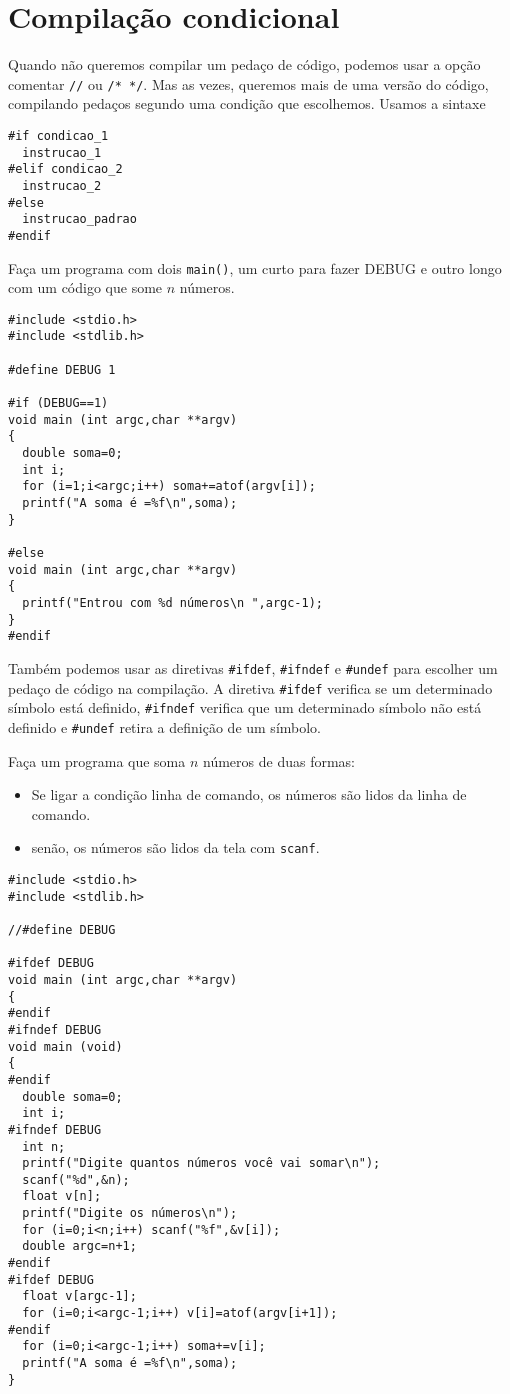 \section{Compilação condicional}
Quando não queremos compilar um pedaço de código, podemos usar a opção comentar \verb|//| ou \verb|/* */|. Mas as vezes, queremos mais de uma versão do código, compilando pedaços segundo uma condição que escolhemos. Usamos a sintaxe
\begin{verbatim}
#if condicao_1
  instrucao_1
#elif condicao_2 
  instrucao_2
#else 
  instrucao_padrao
#endif
\end{verbatim}
\begin{ex}
Faça um programa com dois \verb|main()|, um curto para fazer DEBUG e outro longo com um código que some $n$ números.
\end{ex}
\begin{verbatim}
#include <stdio.h>
#include <stdlib.h>

#define DEBUG 1

#if (DEBUG==1)
void main (int argc,char **argv)
{
  double soma=0;
  int i;
  for (i=1;i<argc;i++) soma+=atof(argv[i]);
  printf("A soma é =%f\n",soma);
}

#else
void main (int argc,char **argv)
{
  printf("Entrou com %d números\n ",argc-1);
}
#endif
\end{verbatim}


Também podemos usar as diretivas \verb|#ifdef|, \verb|#ifndef| e \verb|#undef| para escolher um pedaço de código na compilação. A diretiva \verb|#ifdef| verifica se um determinado símbolo está definido, \verb|#ifndef| verifica que um determinado símbolo não está definido e \verb|#undef| retira a definição de um símbolo.
\begin{ex}
Faça um programa que soma $n$ números de duas formas:
\begin{itemize}
 \item Se ligar a condição linha de comando, os números são lidos da linha de comando.
 \item senão, os números são lidos da tela com \verb|scanf|.
 \end{itemize}
\end{ex}
\begin{verbatim}
#include <stdio.h>
#include <stdlib.h>

//#define DEBUG 

#ifdef DEBUG
void main (int argc,char **argv)
{
#endif
#ifndef DEBUG
void main (void)
{
#endif
  double soma=0;
  int i;
#ifndef DEBUG
  int n;
  printf("Digite quantos números você vai somar\n");
  scanf("%d",&n);
  float v[n];
  printf("Digite os números\n");
  for (i=0;i<n;i++) scanf("%f",&v[i]);
  double argc=n+1;
#endif
#ifdef DEBUG
  float v[argc-1];
  for (i=0;i<argc-1;i++) v[i]=atof(argv[i+1]);
#endif
  for (i=0;i<argc-1;i++) soma+=v[i];
  printf("A soma é =%f\n",soma);
}
\end{verbatim}

